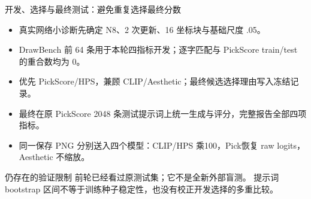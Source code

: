 \documentclass[10pt,aspectratio=169]{beamer}
\begin{document}
\begin{frame}{开发、选择与最终测试：避免重复选择最终分数}
\small
\begin{itemize}\itemsep5pt
\item 真实网络小诊断先确定 N8、2 次更新、16 坐标块与基础尺度 .05。
\item DrawBench 前 64 条用于本轮四指标开发；逐字匹配与 PickScore train/test 的重合数均为 0。
\item 优先 PickScore/HPS，兼顾 CLIP/Aesthetic；最终候选选择理由写入冻结记录。
\item 最终在原 PickScore 2048 条测试提示词上统一生成与评分，完整报告全部四项指标。
\item 同一保存 PNG 分别送入四个模型：CLIP/HPS 乘100，Pick恢复 raw logits，Aesthetic 不缩放。
\end{itemize}
\begin{alertblock}{仍存在的验证限制}
前轮已经看过原测试集；它不是全新外部盲测。
提示词 bootstrap 区间不等于训练种子稳定性，也没有校正开发选择的多重比较。
\end{alertblock}
\end{frame}
\end{document}

